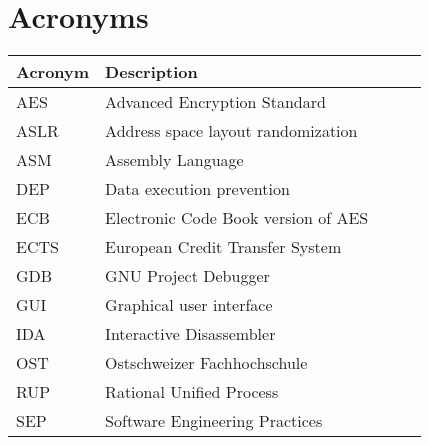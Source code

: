 \section*{Acronyms}
\begin{table}[H]
    \begin{tabular}{|lp{0.815\linewidth}|}
    \hline
    \textbf{Acronym} & \textbf{Description}\\
    \hline
    \hline
    AES          & Advanced Encryption Standard         \\
    ASLR         & Address space layout randomization         \\
    ASM          & Assembly Language         \\
    DEP          & Data execution prevention         \\
    ECB          & Electronic Code Book version of AES         \\
    ECTS         & European Credit Transfer System         \\
    GDB          & GNU Project Debugger        \\
    GUI          & Graphical user interface         \\
    IDA          & Interactive Disassembler         \\
    OST          & Ostschweizer Fachhochschule         \\
    RUP          & Rational Unified Process         \\
    SEP          & Software Engineering Practices \\
    \hline
    \end{tabular}
\end{table}

